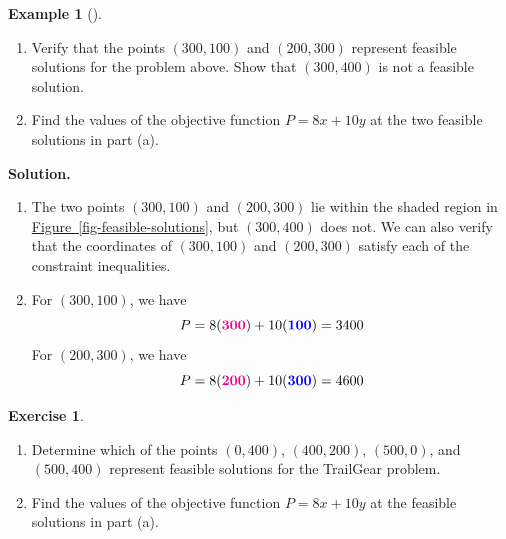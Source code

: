 \documentclass[10pt,]{book}
\theoremstyle{plain}
\theoremstyle{definition}
\theoremstyle{definition}
\newtheorem{example}[theorem]{Example}
\theoremstyle{definition}
\newtheorem{exercise}[theorem]{Exercise}
\numberwithin{equation}{part}
\newcommand{\alert}[1]{\boldsymbol{\color{magenta}{#1}}}
\newcommand{\blert}[1]{\boldsymbol{\color{blue}{#1}}}
\begin{document}
\begin{example}[]\label{example-TrailGear}
\leavevmode%
\begin{enumerate}[label=\alph*]
\item\hypertarget{li-1}{}Verify that the points \((300, 100)\) and \((200, 300)\) represent feasible solutions for the problem above. Show that \((300, 400)\) is not a feasible solution.%
\item\hypertarget{li-2}{}Find the values of the objective function \(P = 8x + 10y\) at the two feasible solutions in part (a).%
\end{enumerate}
%
\par\medskip\noindent%
\textbf{Solution.}\quad \leavevmode%
\begin{enumerate}[label=\alph*]
\item\hypertarget{li-3}{}The two points \((300, 100)\) and \((200, 300)\) lie within the shaded region in \hyperref[fig-feasible-solutions]{Figure~\ref{fig-feasible-solutions}}, but \((300, 400)\) does not. We can also verify that the coordinates of \((300, 100)\) and \((200, 300)\) satisfy each of the constraint inequalities.%
\item\hypertarget{li-4}{}For \((300, 100)\), we have%
\begin{equation*}
P = 8(\alert{300}) + 10(\blert{100}) = 3400
\end{equation*}
For \((200, 300)\), we have%
\begin{equation*}
P = 8(\alert{200}) + 10(\blert{300}) = 4600
\end{equation*}
%
\end{enumerate}
%
\end{example}
\begin{exercise}\label{exercise-1}
\leavevmode%
\begin{enumerate}[label=\alph*]
\item\hypertarget{li-5}{}Determine which of the points \((0, 400)\), \((400, 200)\), \((500, 0)\), and \((500, 400)\) represent feasible solutions for the TrailGear problem.%
\item\hypertarget{li-6}{}Find the values of the objective function \(P = 8x + 10y\) at the feasible solutions in part (a).%
\end{enumerate}
%
\end{exercise}
\typeout{************************************************}
\typeout{************************************************}
\end{document}
